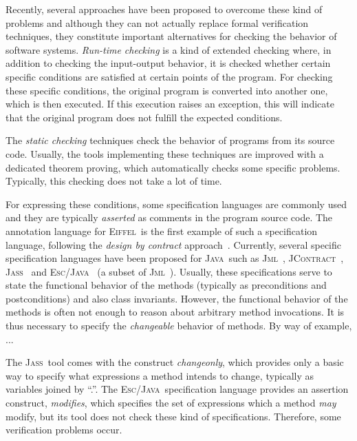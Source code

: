 \documentclass[a4paper]{llncs}
\newcommand{\jml}{\textsc{Jml}}
\newcommand{\escj}{\textsc{Esc/Java}}
\newcommand{\jass}{\textsc{Jass}}
\newcommand{\jcontract}{\textsc{JContract}}
\newcommand{\java}{\textsc{Java}}
\newcommand{\eiff}{\textsc{Eiffel}}
\newcommand{\modifies}{\textit{modifies}}
\begin{document}
Recently, several approaches have been
proposed to overcome these kind of problems and although they can not
actually replace formal verification techniques, they constitute
important alternatives for checking the behavior of software
systems. \emph{Run-time
checking} is a kind of extended checking where, in addition to checking
the input-output behavior, it is checked whether certain specific
conditions are
satisfied at certain points of the program. For checking these
specific conditions, the original program is converted into another
one,
which is then executed. If this execution raises an exception,
this will indicate that the original program does not fulfill the
expected conditions.

The \emph{static checking} techniques check the behavior of programs
from its source code. Usually, the tools implementing these
techniques are improved with a dedicated theorem proving, which
automatically checks some specific problems. Typically, this checking
does not take a lot of time.

For expressing these conditions, some specification languages are
commonly used and they are typically \emph{asserted} as comments in
the
program source code. The annotation language for \eiff~is the first
example of such a specification language, following the \emph{design
by contract} approach~\cite{Meyer97}. Currently, several specific
specification languages have been proposed for \java~such as
\jml~\cite{LeavensBR00}, \jcontract~\cite{JContractUrl},
\jass~\cite{JassUrl} and \escj~\cite{LeinoNS00} (a subset of
\jml~\cite{EscJmlDiff}). Usually, these specifications serve to state
the functional behavior of the methods (typically as preconditions and
postconditions) and also class invariants. However, the
functional behavior of the methods is often not enough to reason about
arbitrary method invocations. It is thus necessary to specify the
\emph{changeable} behavior of methods. By way of example, ...

The \jass~tool comes with the construct \textit{changeonly}, which
provides only a basic way to specify what expressions a method intends
to change, typically as variables joined by ``.''. The
\escj~specification
language provides an assertion construct,
\modifies, which specifies the set of expressions which a method
\emph{may} modify, but its tool does not check these kind of
specifications. Therefore, some verification problems occur.
\end{document}

